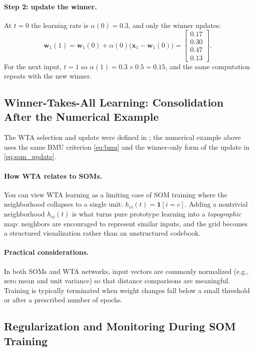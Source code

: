 \paragraph{Step 2: update the winner.}
At \(t=0\) the learning rate is \(\alpha(0)=0.3\), and only the winner updates:
\[
\mathbf{w}_1(1)=\mathbf{w}_1(0)+\alpha(0)\big(\mathbf{x}_1-\mathbf{w}_1(0)\big)
=
\begin{bmatrix}
0.17\\ 0.30\\ 0.47\\ 0.13
\end{bmatrix}.
\]
For the next input, \(t=1\) so \(\alpha(1)=0.3\times 0.5 = 0.15\), and the same computation repeats with the new winner.

\subsection{Winner-Takes-All Learning: Consolidation After the Numerical Example}
\label{sec:som_winner_takes_all_learning_recap}

The WTA selection and update were defined in ; the numerical example above uses the same BMU criterion \eqref{eq:bmu} and the winner-only form of the update in \eqref{eq:som_update}.

\paragraph{How WTA relates to SOMs.}
You can view WTA learning as a limiting case of SOM training where the neighborhood collapses to a single unit: \(h_{ci}(t)=\mathbf{1}[i=c]\). Adding a nontrivial neighborhood \(h_{ci}(t)\) is what turns pure prototype learning into a \emph{topographic} map: neighbors are encouraged to represent similar inputs, and the grid becomes a structured visualization rather than an unstructured codebook.

\paragraph{Practical considerations.}
In both SOMs and WTA networks, input vectors are commonly normalized (e.g., zero mean and unit variance) so that distance comparisons are meaningful. Training is typically terminated when weight changes fall below a small threshold or after a prescribed number of epochs.

\subsection{Regularization and Monitoring During SOM Training}
\label{sec:som_regularization_and_monitoring_during_som_training}

